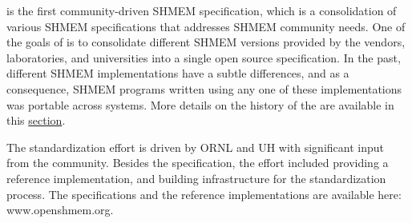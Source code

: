 \openshmem is the first community-driven SHMEM specification,
which is a consolidation of various SHMEM specifications that addresses SHMEM community needs. 
One of the goals of \openshmem is to consolidate different SHMEM versions
provided by the vendors, laboratories, and universities into a single open
source specification. In the past, different SHMEM implementations have a subtle
differences, and as a consequence, SHMEM programs written using any one of these 
implementations was portable across systems. 
More details on the history of the \openshmem are available in this
\hyperref[sec:openshmem_history]{section}.

The \openshmem standardization effort is driven by \ac{ORNL} and \ac{UH} 
with significant input from the \openshmem{} community. Besides the
specification, the effort included providing a reference implementation,
 and building infrastructure for the standardization process.
The specifications and the reference implementations are available here: 
www.openshmem.org.

